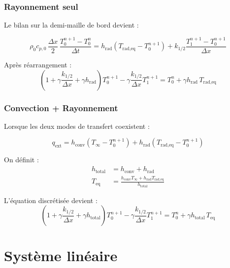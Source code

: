 \documentclass[11pt,a4paper]{article}
\begin{document}
\subsubsection{Rayonnement seul}

Le bilan sur la demi-maille de bord devient :

\begin{equation}
\rho_0 c_{p,0} \, \frac{\Delta x}{2} \, \frac{T_0^{n+1} - T_0^n}{\Delta t} = h_{\text{rad}}(T_{\text{rad,eq}} - T_0^{n+1}) + k_{1/2} \frac{T_1^{n+1} - T_0^{n+1}}{\Delta x}
\end{equation}

Après réarrangement :
\begin{equation}
\left(1 + \gamma \frac{k_{1/2}}{\Delta x} + \gamma h_{\text{rad}}\right) T_0^{n+1} - \gamma \frac{k_{1/2}}{\Delta x} T_1^{n+1} = T_0^n + \gamma h_{\text{rad}} \, T_{\text{rad,eq}}
\end{equation}

\subsubsection{Convection + Rayonnement}

Lorsque les deux modes de transfert coexistent :

\begin{tcolorbox}[colback=red!5,colframe=rouge,title=\textbf{Condition convection + rayonnement}]
\begin{equation}
q_{\text{ext}} = h_{\text{conv}}(T_\infty - T_0^{n+1}) + h_{\text{rad}}(T_{\text{rad,eq}} - T_0^{n+1})
\end{equation}

On définit :
\begin{align}
h_{\text{total}} &= h_{\text{conv}} + h_{\text{rad}} \\
T_{\text{eq}} &= \frac{h_{\text{conv}} T_\infty + h_{\text{rad}} T_{\text{rad,eq}}}{h_{\text{total}}}
\end{align}

L'équation discrétisée devient :
\begin{equation}
\left(1 + \gamma \frac{k_{1/2}}{\Delta x} + \gamma h_{\text{total}}\right) T_0^{n+1} - \gamma \frac{k_{1/2}}{\Delta x} T_1^{n+1} = T_0^n + \gamma h_{\text{total}} \, T_{\text{eq}}
\end{equation}
\end{tcolorbox}

\section{Système linéaire}
\end{document}
